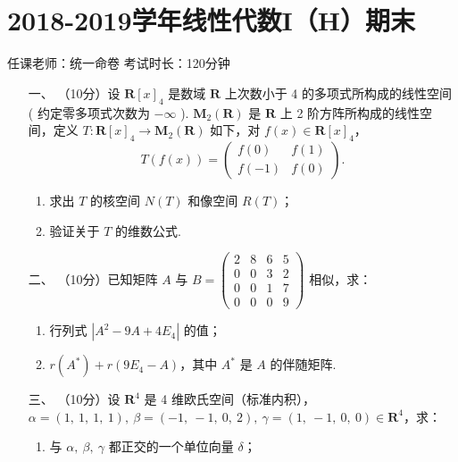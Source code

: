 \section*{2018-2019学年线性代数I（H）期末}

\begin{center}
    任课老师：统一命卷\hspace{4em} 考试时长：120分钟
\end{center}

\begin{enumerate}
	\item[一、]（10分）设 $\mathbf{R}[x]_4$ 是数域 $\mathbf{R}$ 上次数小于 4 的多项式所构成的线性空间 ( 约定零多项式次数为 $-\infty$ ). $\mathbf{M}_2(\mathbf{R})$ 是 $\mathbf{R}$ 上 2 阶方阵所构成的线性空间，定义 $T : \mathbf{R}[x]_4 \to \mathbf{M}_2(\mathbf{R})$ 如下，对 $f(x) \in \mathbf{R}[x]_4$，
    \[T(f(x))=\begin{pmatrix}f(0) & f(1) \\ f(-1) & f(0)\end{pmatrix}.\]
    \begin{enumerate}[label=(\arabic*)]
        \item 求出 $T$ 的核空间 $N(T)$ 和像空间 $R(T)$；

        \item 验证关于 $T$ 的维数公式.
    \end{enumerate}
	\item[二、]（10分）已知矩阵 $A$ 与 $B=\begin{pmatrix}2 & 8 & 6 & 5 \\ 0 & 0 & 3 & 2 \\ 0 & 0 & 1 & 7 \\ 0 & 0 & 0 & 9\end{pmatrix}$ 相似，求：
    \begin{enumerate}[label=(\arabic*)]
        \item 行列式 $|A^2-9A+4E_4|$ 的值；

        \item $r(A^*)+r(9E_4-A)$，其中 $A^*$ 是 $A$ 的伴随矩阵.
    \end{enumerate}
	\item[三、]（10分）设 $\mathbf{R}^4$ 是 4 维欧氏空间（标准内积），$\alpha=(1,\ 1,\ 1,\ 1),\ \beta=(-1,\ -1,\ 0,\ 2),\ \gamma=(1,\ -1,\ 0,\ 0) \in \mathbf{R}^4$，求：
    \begin{enumerate}[label=(\arabic*)]
        \item 与 $\alpha,\ \beta,\ \gamma$ 都正交的一个单位向量 $\delta$；


\end{enumerate}
\end{enumerate}
